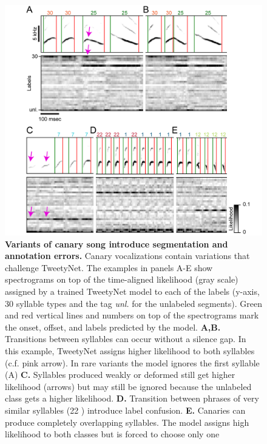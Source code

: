 \documentclass[10pt,letterpaper]{article}
\begin{document}
\begin{table}[h!]
\label{table:1}
\end{table}


\begin{figure}[!h]
\includegraphics[scale=1.0]{Figures/fig7/fig7_model_err_examples.png}
\caption{{\bf Variants of canary song introduce segmentation and annotation errors.}
Canary vocalizations contain variations that challenge TweetyNet. The examples in panels A-E show spectrograms on top of the time-aligned likelihood (gray scale) assigned by a trained TweetyNet model to each of the labels (y-axis, 30 syllable types and the tag \textit{unl.} for the unlabeled segments). Green and red vertical lines and numbers on top of the spectrograms mark the onset, offset, and labels predicted by the model. 
\textbf{A,B.} Transitions between syllables can occur without a silence gap. In this example, TweetyNet assigns higher likelihood to both syllables (c.f. pink arrow). In rare variants the model ignores the first syllable (A)      
\textbf{C.} Syllables produced weakly or deformed still get higher likelihood (arrows) but may still be ignored because the unlabeled class gets a higher likelihood.
\textbf{D.} Transition between phrases of very similar syllables (22 ) introduce label confusion.
\textbf{E.} Canaries can produce completely overlapping syllables. The model assigns high likelihood to both classes but is forced to choose only one}
\label{fig7}
\end{figure}
\end{document}

